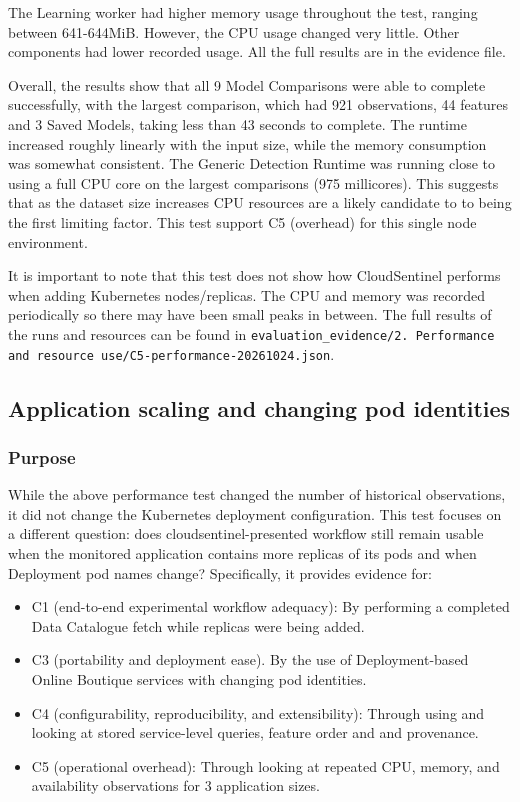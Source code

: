 The Learning worker had higher memory usage throughout the test, ranging between 641-644MiB. However, the CPU usage changed very little. Other components had lower recorded usage. All the full results are in the evidence file.

Overall, the results show that all 9 Model Comparisons were able to complete successfully, with the largest comparison, which had 921 observations, 44 features and 3 Saved Models, taking less than 43 seconds to complete. The runtime increased roughly linearly with the input size, while the memory consumption was somewhat  consistent. The Generic Detection Runtime was running close to using a full CPU core on the largest comparisons (975 millicores). This suggests that as the dataset size increases CPU resources are a likely candidate to to being the first limiting factor. This test support C5 (overhead) for this single node environment.

It is important to note that this test does not show how CloudSentinel performs when adding Kubernetes nodes/replicas. The CPU and memory was recorded periodically so there may have been small peaks in between. The full results of the runs and resources can be found in \texttt{evaluation\_evidence/2. Performance and resource use/C5-performance-20261024.json}.

\subsection{Application scaling and changing pod identities}

\subsubsection{Purpose}
While the above performance test changed the number of historical observations, it did not change the Kubernetes deployment configuration. This test focuses on a different question: does cloudsentinel-presented workflow still remain usable when the monitored application contains more replicas of its pods and when Deployment pod names change? Specifically, it provides evidence for:

\begin{itemize}
    \item C1 (end-to-end experimental workflow adequacy): By performing a completed Data Catalogue fetch while replicas were being added.
    \item C3 (portability and deployment ease). By the use of Deployment-based Online Boutique services with changing pod identities.
    \item C4 (configurability, reproducibility, and extensibility): Through using and looking at stored service-level queries, feature order and and  provenance.
    \item C5 (operational overhead): Through looking at repeated CPU, memory, and availability observations for 3 application sizes.
\end{itemize}

